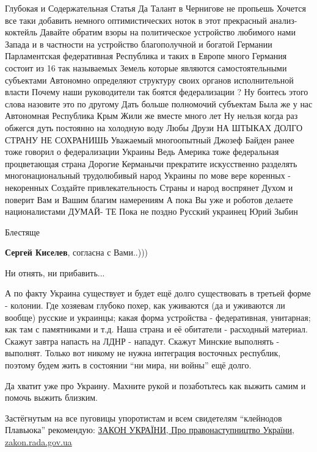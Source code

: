 \begin{itemize}

Глубокая и Содержательная Статья Да Талант в Чернигове не пропьешь Хочется все
таки добавить немного оптимистических ноток в этот прекрасный анализ- коктейль
Давайте обратим взоры на политическое устройство любимого нами Запада и в
частности на устройство благополучной и богатой Германии Парламентская
федеративная Республика и таких в Европе много Германия состоит из 16 так
называемых Земель которые являются самостоятельными субъектами Автономно
определяют структуру своих органов исполнительной власти Почему наши
руководители так боятся федерализации ? Ну боитесь этого слова назовите это по
другому Дать больше полномочий субъектам Была же у нас Автономная Республика
Крым Жили же вместе много лет Ну нельзя когда раз обжегся дуть постоянно на
холодную воду Любы Друзи НА ШТЫКАХ ДОЛГО СТРАНУ НЕ СОХРАНИШЬ Уважаемый
многоопытный Джозеф Байден ранее тоже говорил о федерализации Украины Ведь
Америка тоже федеральная процветающая страна Дорогие Керманычи прекратите
искусственно разделять многонациональный трудолюбивый народ Украины по мове
вере коренных - некоренных Создайте привлекательность Страны и народ воспрянет
Духом и поверит Вам и Вашим благим намерениям А пока Вы уже и роботов делаете
националистами ДУМАЙ- ТЕ Пока не поздно Русский украинец Юрий Зыбин

Блестяще

\textbf{Сергей Киселев}, согласна с Вами..)))

Ни отнять, ни прибавить...


А по факту Украина существует и будет ещё долго существовать в третьей форме -
колонии. Где хозяевам глубоко похер, как уживаются (да и уживаются ли вообще)
русские и украинцы; какая форма устройства - федеративная, унитарная; как там с
памятниками и т.д. Наша страна и её обитатели - расходный материал. Скажут
завтра напасть на ЛДНР - нападут. Скажут Минские выполнять - выполнят. Только
вот никому не нужна интеграция восточных республик, поэтому будем жить в
состоянии \enquote{ни мира, ни войны} ещё долго.


Да хватит уже про Украину. Махните рукой и позаботьтесь как выжить самим и
помочь выжить близким.


Застёгнутым на все пуговицы упоротистам и всем свидетелям \enquote{клейнодов Плавьюка}
рекомендую: \href{https://zakon.rada.gov.ua/laws/show/1543-12#Text}{%
ЗАКОН УКРАЇНИ, Про правонаступництво України, zakon.rada.gov.ua%
}

\end{itemize} %
